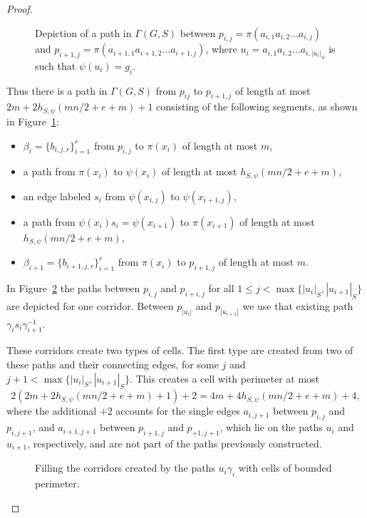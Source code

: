 \documentclass[11pt]{amsart}
\theoremstyle{definition}
\begin{document}
\begin{proof}
 \begin{figure}[h!]

\caption{Depiction of a path in $\Gamma(G,S)$ between $p_{i,j} = \pi(a_{i,1}a_{i,2}\dots a_{i,j})$ and $p_{i+1,j} = \pi(a_{i+1,1}a_{i+1,2}\dots a_{i+1,j})$, where $u_i=a_{i,1}a_{i,2}\dots a_{i,|u_i|_S}$ is such that $\psi(u_i) = g_i$.}\label{fig:filling2}
\end{figure}


Thus there is a path in $\Gamma(G,S)$ from $p_{ij}$ to $p_{i+1,j}$ of length at most $2m+2h_{S,\psi}(mn/2+e+m)+1$
consisting of the following segments, as shown in Figure~\ref{fig:filling2}:
\begin{itemize}[itemsep=5pt]
\item $\beta_i=\{b_{i,j,r}\}_{i=1}^r$ from $p_{i,j}$ to $\pi(x_i)$ of length at most $m$,
\item a path from $\pi(x_i)$ to $\psi(x_i)$ of length at most $h_{S,\psi}(mn/2+e+m)$,
\item an edge labeled $s_i$ from $\psi(x_{i,j})$ to $\psi(x_{i+1,j})$,
\item a path from $\psi(x_i)s_i = \psi(x_{i+1})$ to $\pi(x_{i+1})$ of length at most $h_{S,\psi}(mn/2+e+m)$,
\item $\beta_{i+1}=\{b_{i+1,j,r}\}_{i=1}^r$ from $\pi(x_i)$ to $p_{i+1,j}$ of length at most $m$.
\end{itemize}

In Figure~\ref{fig:filling3} the paths between $p_{i,j}$ and $p_{i+i,j}$ for all $1 \leq j < \max\{|u_i|_S,|u_{i+1}|_S\}$ are  depicted for one corridor.
Between $p_{|u_i|}$ and $p_{|u_{i+1}|}$ we use that existing path
$\gamma_i s_i \gamma_{i+1}^{-1}$.

These corridors create two types of cells.  The first
type are created from two of these paths and their connecting edges, for some $j$ and $j+1 < \max\{|u_i|_S,|u_{i+1}|_S\}$.
This creates a cell with perimeter at most
\[2(2m+2h_{S,\psi}(mn/2+e+m)+1) + 2 = 4m+4h_{S,\psi}(mn/2+e+m)+4,\] where the additional $+2$ accounts for the single edges $a_{i,j+1}$   between $p_{i,j}$ and $p_{i,j+1}$, and   $a_{i+1,j+1}$  between $p_{i+1,j}$ and $p_{+1,j+1}$, which lie on the paths $u_i$ and $u_{i+1}$, respectively, and are not part of the paths previously constructed.



\begin{figure}[h!]

\caption{Filling the corridors created by the paths $u_i\gamma_i$ with cells of bounded perimeter.}\label{fig:filling3}
\end{figure}


\end{proof}
\end{document}
